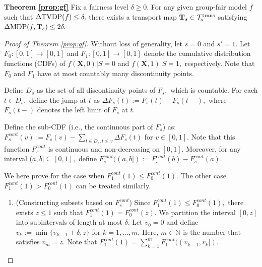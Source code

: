 \documentclass[10pt]{article} %
\newtheorem{lemma}[theorem]{Lemma}
\begin{document}
\textbf{Theorem \ref{prop:gf}}
    Fix a fairness level $\delta \ge 0.$
    For any given group-fair model $f$ such that $\Delta \textup{TVDP}(f) \le \delta,$
    there exists a transport map $\mathbf{T}_{s} \in \mathcal{T}_{s}^{\textup{trans}}$ satisfying
    $\Delta \textup{MDP}(f, \mathbf{T}_{s}) \le 2 \delta.$


\begin{proof}[Proof of Theorem \ref{prop:gf}]
    Without loss of generality, let $s = 0$ and $s' = 1.$    
    Let $F_{0} : [0, 1] \rightarrow [0, 1]$ and $F_{1} : [0, 1] \rightarrow [0, 1]$ denote the cumulative distribution functions (CDFs) of $f(\mathbf{X}, 0) | S = 0$ and $f(\mathbf{X}, 1) | S = 1,$ respectively.
    Note that $F_{0}$ and $F_{1}$ have at most countably many discontinuity points.

    Define $D_{s}$ as the set of all discontinuity points of $F_{s},$ which is countable.
        For each $t \in D_{s},$ define the jump at $t$ as $\Delta F_{s}(t) := F_{s}(t) - F_{s}(t -),$
        where $F_{s}(t-)$ denotes the left limit of $F_{s}$ at $t.$
    
    Define the sub-CDF (i.e., the continuous part of $F_{s}$) as:
    $F_{s}^{cont}(v) := F_{s}(v) - \sum_{t \in D_{s}, t \le v} \Delta F_{s}(t)$ for $v \in [0, 1].$
        Note that this function $F_{s}^{cont}$ is continuous and non-decreasing on $[0, 1].$
        Moreover, for any interval $(a, b] \subseteq [0, 1],$ define $F_{s}^{cont}((a, b]) := F_{s}^{cont}(b) - F_{s}^{cont}(a).$

    We here prove for the case when $F_{1}^{cont}(1) \le F_{0}^{cont}(1).$
    The other case $F_{1}^{cont}(1) > F_{0}^{cont}(1)$ can be treated similarly.

    \begin{enumerate}
        \item (Constructing subsets based on $F_{s}^{cont}$)
        Since $F_{1}^{cont}(1) \le F_{0}^{cont}(1),$ there exists $z \le 1$ such that $F_{1}^{cont}(1) = F_{0}^{cont}(z).$
            We partition the interval $[0, z]$ into subintervals of length at most $\delta.$
            Let $v_{0} = 0$ and define $v_{k} := \min \{ v_{k-1} + \delta, z \}$ for $k = 1, \ldots, m.$
            Here, $m \in \mathbb{N}$ is the number that satisfies $v_{m} = z.$
            Note that $F_{1}^{cont}(1) = \sum_{k=1}^{m} F_{1}^{cont}((v_{k-1}, v_{k}]).$


\end{enumerate}
\end{proof}
\end{document}
